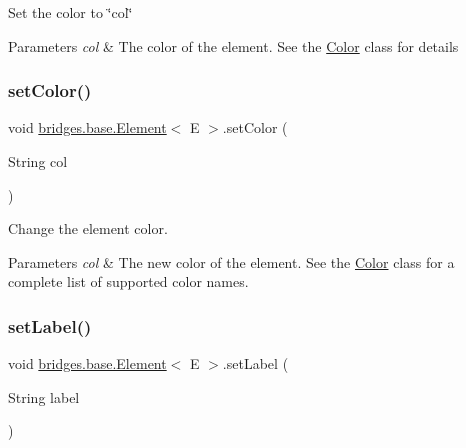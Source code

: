 Set the color to \char`\"{}col\char`\"{} 
\begin{DoxyParams}{Parameters}
{\em col} & The color of the element. See the \hyperlink{classbridges_1_1base_1_1_color}{Color} class for details \\
\hline
\end{DoxyParams}
\mbox{\label{classbridges_1_1base_1_1_element_a336f2ff70a0873fde6f0b8a43b670ffc}} 
\subsubsection{\texorpdfstring{set\+Color()}{setColor()}\hspace{0.1cm}{\footnotesize\ttfamily [2/2]}}
{\footnotesize\ttfamily void \hyperlink{classbridges_1_1base_1_1_element}{bridges.\+base.\+Element}$<$ E $>$.set\+Color (\begin{DoxyParamCaption}\item[{String}]{col }\end{DoxyParamCaption})}



Change the element color. 


\begin{DoxyParams}{Parameters}
{\em col} & The new color of the element. See the \hyperlink{classbridges_1_1base_1_1_color}{Color} class for a complete list of supported color names. \\
\hline
\end{DoxyParams}
\mbox{\label{classbridges_1_1base_1_1_element_a942ccd766aeca0c4fdbe27ef8cbe78d9}} 
\subsubsection{\texorpdfstring{set\+Label()}{setLabel()}}
{\footnotesize\ttfamily void \hyperlink{classbridges_1_1base_1_1_element}{bridges.\+base.\+Element}$<$ E $>$.set\+Label (\begin{DoxyParamCaption}\item[{String}]{label }\end{DoxyParamCaption})}

